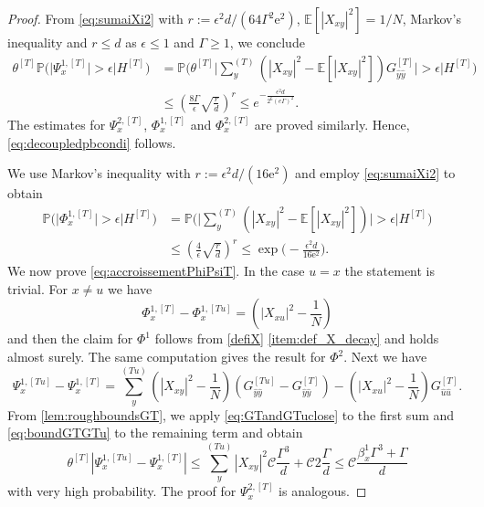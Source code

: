 \documentclass[10pt,a4paper]{amsart}
\newcommand{\ee}{\mathrm{e}}
\newcommand{\abs}[1]{\left| #1 \right|}
\numberwithin{equation}{section}
\newcommand*\bset[1]{[#1]}
\newcommand*\ubarr[1]{{\widehat{#1}}}
\begin{document}
	\begin{proof}
From \cref{eq:sumaiXi2} with $r:= \epsilon^2 d/(64 \Gamma^2 \ee^2)$, $\mathbb{E}[\abs{X_{xy}}^2]  = 1/N$, Markov's inequality 
		and $r \leq d$ as $\epsilon \leq 1$ and $\Gamma \geq 1$, 
		we conclude  
		\begin{align*}
			\theta^{\bset{T}} \mathbb{P} \big( \big|\Psi_x^{1,\bset{T}}\big| > \epsilon \big| H^{\bset{T}} \big) &= \mathbb{P} \biggl(\theta^{\bset{T}} \biggl| \sum_{y}^{(T)} \left( \abs{X_{xy}}^2 - \mathbb{E}[\abs{X_{xy}}^2]\right) G_{\ubarr{y}\ubarr{y}}^{\bset{T}}\biggr| > \epsilon \bigg| H^{\bset{T}} \biggr) \\
			&\le \left( \frac{8 \Gamma}{\epsilon} \sqrt{\frac{r}{d}} \right)^r \le e^{-\frac{ \epsilon^2 d}{2^6(e\Gamma)^2}}.
		\end{align*}
		The estimates for $\Psi_x^{2,\bset{T}}$, $\Phi_x^{1,\bset{T}}$ and $\Phi_x^{2,\bset{T}}$ are proved similarly.
		Hence, \cref{eq:decoupledpbcondi} follows. 
		
		We use Markov's inequality with $r:= \epsilon^2d/(16 \ee^2)$ and employ \cref{eq:sumaiXi2} to obtain 
			\begin{align*}
			\mathbb{P} \big( \big|\Phi_x^{1,\bset{T}}\big| > \epsilon \big| H^{\bset{T}} \big) &= \mathbb{P} \biggl(\biggl| \sum_{y}^{(T)} \left( \abs{X_{xy}}^2 - \mathbb{E}[\abs{X_{xy}}^2]\right) \biggr| > \epsilon \bigg| H^{\bset{T}} \biggr) \\
			&\le \left( \frac{4}{\epsilon} \sqrt{\frac{r}{d}} \right)^r \le \exp\bigg(- \frac{\epsilon^2 d}{16\ee^2}\bigg).
		\end{align*}
		We now prove \cref{eq:accroissementPhiPsiT}. In the case $u =x$ the statement is trivial. For $x \neq u$ we have
		\begin{equation*}
			\Phi^{1,\bset{T}}_{x} - \Phi^{1,\bset{Tu}}_x =  \left( \abs{X_{xu}}^2 - \frac{1}{N}\right)
		\end{equation*}
		and then the claim for $\Phi^1$ follows from \cref{defiX} \cref{item:def_X_decay} and holds almost surely. The same computation gives the result for $\Phi^2$. Next we have 
		\begin{equation*}
			\Psi_{x}^{1,\bset{Tu}} - \Psi_{x}^{1,\bset{T}} = \sum_{y}^{(Tu)} \left( \abs{X_{xy}}^2 - \frac{1}{N} \right) (G_{\ubarr{y}\ubarr{y}}^{\bset{Tu}} -G_{\ubarr{y}\ubarr{y}}^{\bset{T}}) - \left( \abs{X_{xu}}^2 - \frac{1}{N} \right)G_{\ubarr{u}\ubarr{u}}^{\bset{T}}.
		\end{equation*}
		From \cref{lem:roughboundsGT}, we apply \cref{eq:GTandGTuclose} to the first sum and \cref{eq:boundGTGTu} to the remaining term and obtain
		\begin{equation*}
			\theta^{\bset{T}} \abs{\Psi_x^{1,\bset{Tu}} - \Psi_x^{1,\bset{T}}} \le \sum_{y}^{(Tu)}\abs{X_{xy}}^2 \mathcal{C}\frac{\Gamma^3}{d} + \mathcal{C}2 \frac{\Gamma}{d}  \le \mathcal{C} \frac{ \beta_{x}^1 \Gamma^3+ \Gamma}{d}
		\end{equation*}
		with very high probability. The proof for $\Psi_x^{2,\bset{T}}$ is analogous.
	\end{proof}
\end{document}
